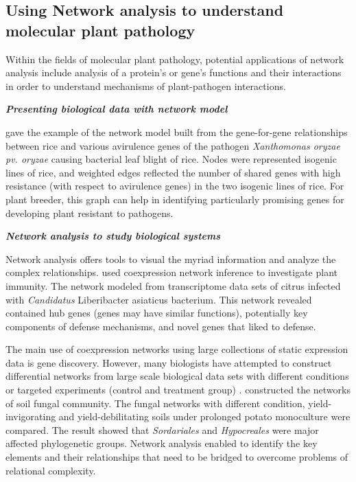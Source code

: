 \subsection*{Using Network analysis to understand molecular plant pathology}

Within the fields of molecular plant pathology, potential applications of network analysis include analysis of a protein’s or gene’s functions and their interactions in order to understand mechanisms of plant-pathogen interactions.

\textit{\textbf{Presenting biological data with network model}}

 gave the example of the network model built from the gene-for-gene relationships between rice and various avirulence genes of the pathogen \textit{Xanthomonas oryzae pv. oryzae} causing bacterial leaf blight of rice. Nodes were represented isogenic lines of rice, and weighted edges reflected the number of shared genes with high resistance (with respect to avirulence genes) in the two isogenic lines of rice. For plant breeder, this graph can help in identifying particularly promising genes for developing plant resistant to pathogens. 

\textit{\textbf{Network analysis to study biological systems}}

Network analysis offers tools to visual the myriad information and analyze the complex relationships.  used coexpression network inference to investigate plant immunity. The network modeled from transcriptome data sets of citrus infected with \textit{Candidatus} Liberibacter asiaticus bacterium. This network revealed contained hub genes (genes may have similar functions), potentially key components of defense mechanisms, and novel genes that liked to defense. 

The main use of coexpression networks using large collections of static expression data is gene discovery. However, many biologists have attempted to construct differential networks from large scale biological data sets with different conditions or targeted experiments (control and treatment group) .  constructed the networks of soil fungal community. The fungal networks with different condition, yield-invigorating and yield-debilitating soils under prolonged potato monoculture were compared. The result showed that \textit{Sordariales} and \textit{Hypocreales} were major affected phylogenetic groups. Network analysis enabled to identify the key elements and their relationships that need to be bridged to overcome problems of relational complexity.

